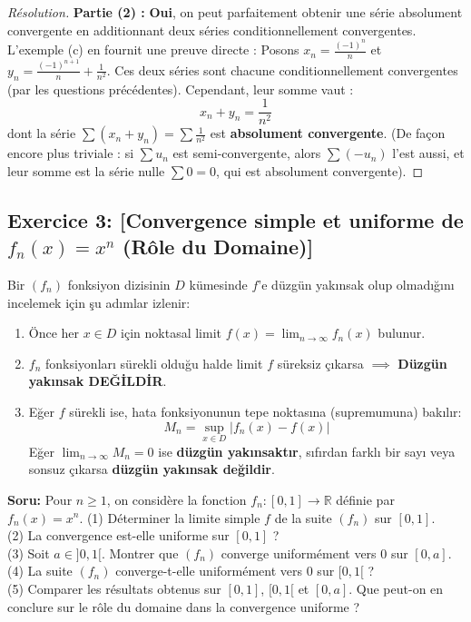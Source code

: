 \documentclass[12pt,a4paper]{report}
\begin{document}
\begin{proof}[Résolution]
\textbf{Partie (2) :} 
\textbf{Oui}, on peut parfaitement obtenir une série absolument convergente en additionnant deux séries conditionnellement convergentes.
L'exemple (c) en fournit une preuve directe : 
Posons $x_n = \frac{(-1)^n}{n}$ et $y_n = \frac{(-1)^{n+1}}{n} + \frac{1}{n^2}$.
Ces deux séries sont chacune conditionnellement convergentes (par les questions précédentes).
Cependant, leur somme vaut :
\[ x_n + y_n = \frac{1}{n^2} \]
dont la série $\sum (x_n + y_n) = \sum \frac{1}{n^2}$ est \textbf{absolument convergente}.
(De façon encore plus triviale : si $\sum u_n$ est semi-convergente, alors $\sum (-u_n)$ l'est aussi, et leur somme est la série nulle $\sum 0 = 0$, qui est absolument convergente).
\end{proof}

\subsection*{Exercice 3: [Convergence simple et uniforme de $f_n(x) = x^n$ (Rôle du Domaine)]}

\begin{tcolorbox}[colback=blue!5!white,colframe=blue!75!black,title=Hatırlatma: Bir Fonksiyon Dizisinin Düzgün Yakınsaklığı Nasıl İncelenir?]
Bir $(f_n)$ fonksiyon dizisinin $D$ kümesinde $f$'e düzgün yakınsak olup olmadığını incelemek için şu adımlar izlenir:
\begin{enumerate}
    \item Önce her $x \in D$ için noktasal limit $f(x) = \lim_{n \to \infty} f_n(x)$ bulunur.
    \item $f_n$ fonksiyonları sürekli olduğu halde limit $f$ süreksiz çıkarsa $\implies$ \textbf{Düzgün yakınsak DEĞİLDİR}.
    \item Eğer $f$ sürekli ise, hata fonksiyonunun tepe noktasına (supremumuna) bakılır:
    \[ M_n = \sup_{x \in D} |f_n(x) - f(x)| \]
    Eğer $\lim_{n \to \infty} M_n = 0$ ise \textbf{düzgün yakınsaktır}, sıfırdan farklı bir sayı veya sonsuz çıkarsa \textbf{düzgün yakınsak değildir}.
\end{enumerate}
\end{tcolorbox}

\textbf{Soru:}
Pour $n \ge 1$, on considère la fonction $f_n : [0, 1] \to \mathbb{R}$ définie par $f_n(x) = x^n$.
(1) Déterminer la limite simple $f$ de la suite $(f_n)$ sur $[0, 1]$.\\
(2) La convergence est-elle uniforme sur $[0, 1]$ ?\\
(3) Soit $a \in ]0, 1[$. Montrer que $(f_n)$ converge uniformément vers 0 sur $[0, a]$.\\
(4) La suite $(f_n)$ converge-t-elle uniformément vers 0 sur $[0, 1[$ ?\\
(5) Comparer les résultats obtenus sur $[0, 1]$, $[0, 1[$ et $[0, a]$. Que peut-on en conclure sur le rôle du domaine dans la convergence uniforme ?
\end{document}
